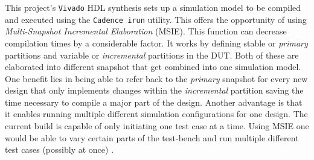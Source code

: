 This project's \texttt{Vivado} \acs{HDL} synthesis sets up a simulation model to be compiled and executed using the \texttt{Cadence irun} utility. This offers the opportunity of using \textit{Multi-Snapshot Incremental Elaboration}  (MSIE). This function can decrease compilation times by a considerable factor. It works by defining stable or \textit{primary} partitions and variable or \textit{incremental} partitions in the \acs{DUT}. Both of these are elaborated into different snapshot that get combined into one simulation model. One benefit lies in being able to refer back to the \textit{primary} snapshot for every new design that only implements changes within the \textit{incremental} partition saving the time necessary to compile a major part of the design. Another advantage is that it enables running multiple different simulation configurations for one design. The current build is capable of only initiating one test case at a time. Using \acs{MSIE} one would be able to vary certain parts of the test-bench and run multiple different test cases (possibly at once) \cite[see][]{Cad18}.